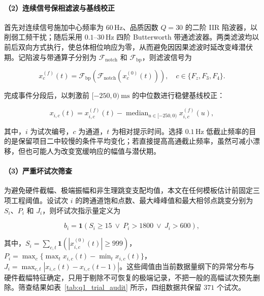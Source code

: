 \documentclass[a4paper]{ctexart}
\numberwithin{figure}{section}       %
\begin{document}
\paragraph{（2）连续信号保相滤波与基线校正}

首先对连续信号施加中心频率为 $60\,\mathrm{Hz}$、品质因数 $Q=30$ 的二阶 IIR 陷波器，以削弱工频干扰；随后采用 $0.1$--$30\,\mathrm{Hz}$ 四阶 Butterworth 带通滤波器。两类滤波均以前后双向方式执行，使总体相位响应为零，从而避免因因果滤波时延改变峰潜伏期。记陷波与带通算子分别为 $\mathcal{F}_{\mathrm{notch}}$ 和 $\mathcal{F}_{\mathrm{bp}}$，则滤波信号为

\begin{equation}
    x^{(f)}_c(t)=\mathcal{F}_{\mathrm{bp}}\!\left(\mathcal{F}_{\mathrm{notch}}\!\left(x^{(0)}_c(t)\right)\right),
    \quad c\in\{F_z,F_3,F_4\}.
    \label{eq:q1_filter}
\end{equation}

完成事件分段后，以刺激前 $[-250,0)~\mathrm{ms}$ 的中位数进行稳健基线校正：

\begin{equation}
    x_{i,c}(t)=x^{(f)}_{i,c}(t)-
    \mathop{\mathrm{median}}_{u\in[-250,0)}x^{(f)}_{i,c}(u),
    \label{eq:q1_baseline}
\end{equation}

其中，$i$ 为试次编号，$c$ 为通道，$t$ 为相对提示时间。选择 $0.1\,\mathrm{Hz}$ 低截止频率的目的是保留项目二中较慢的条件平均变化；若直接提高高通截止频率，虽然可减小漂移，但也可能人为改变宽缓响应的幅值与潜伏期。

\paragraph{（3）严重坏试次筛查}

为避免硬件截幅、极端振幅和非生理跳变支配均值，本文在任何模板估计前固定三项工程阈值。设试次 $i$ 的跨通道饱和点数、最大峰峰值和最大相邻点跳变分别为 $S_i$、$P_i$ 和 $J_i$，则坏试次指示量定义为

\begin{equation}
    b_i=\mathbf{1}\!\left(S_i\ge 15\ \lor\ P_i>1800\ \lor\ J_i>600\right),
    \label{eq:q1_badtrial}
\end{equation}

其中，$S_i=\sum_{c,t}\mathbf{1}(|x^{(0)}_{i,c}(t)|\ge999)$，$P_i=\max_c\{\max_t x_{i,c}(t)-\min_t x_{i,c}(t)\}$，$J_i=\max_{c,t}|x_{i,c}(t)-x_{i,c}(t-1)|$。这些阈值由当前数据量纲下的异常分布与硬件截幅特征确定，只用于剔除不可恢复的极端记录，不把一般的高幅试次预先删除。筛查结果如表~\ref{tab:q1_trial_audit} 所示，四组数据共保留 $371$ 个试次。
\end{document}
